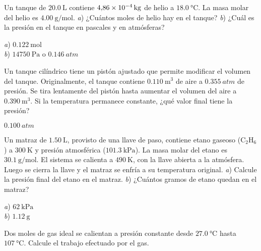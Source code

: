 \setcounter{figure}{0}
%
\begin{Exercise}
  Un tanque de $\SI{20.0}{\liter}$ contiene $\SI{4.86E-4}{\kilogram}$ de helio a $\SI{18.0}{\celsius}$. La masa molar del helio es $\SI{4.00}{\gram/\mole}$. \textit{a}) ¿Cuántos moles de helio hay en el tanque? \textit{b}) ¿Cuál es la presión en el tanque en pascales y en atmósferas?
\end{Exercise}
\begin{Answer}
	\begin{minipage}[t]{.4\textwidth}
    \textit{a}) $\SI{0.122}{\mole}$\\ \textit{b}) $\SI{14750}{\pascal}$ o $\SI{0.146}{atm}$
  \end{minipage}
\end{Answer}
%
\begin{Exercise}
  Un tanque cilíndrico tiene un pistón ajustado que permite modificar el volumen del tanque. Originalmente, el tanque contiene $\SI{0.110}{\cubic\metre}$ de aire a $\SI{0.355}{atm}$ de presión. Se tira lentamente del pistón hasta aumentar el volumen del aire a $\SI{0.390}{\cubic\metre}$. Si la temperatura permanece constante, ¿qué valor final tiene la presión?
\end{Exercise}
\begin{Answer}
  $\SI{0.100}{atm}$
\end{Answer}
%
\begin{Exercise}
  Un matraz de $\SI{1.50}{\liter}$, provisto de una llave de paso, contiene etano gaseoso ($\text{C}_2\text{H}_6$) a $\SI{300}{\kelvin}$ y presión atmosférica ($\SI{101.3}{\kilo\pascal}$). La masa molar del etano es $\SI{30.1}{\gram/\mole}$. El sistema se calienta a $\SI{490}{\kelvin}$, con la llave abierta a la atmósfera. Luego se cierra la llave y el matraz se enfría a su temperatura  original. \textit{a}) Calcule la presión final del etano en el matraz. \textit{b}) ¿Cuántos gramos de etano quedan en el matraz?
\end{Exercise}
\begin{Answer}
	\begin{minipage}[t]{.4\textwidth}
    \textit{a}) $\SI{62}{\kilo\pascal}$\\ \textit{b}) $\SI{1.12}{\gram}$
  \end{minipage}
\end{Answer}
%
\begin{Exercise}
  Dos moles de gas ideal se calientan a presión constante desde $\SI{27.0}{\celsius}$ hasta $\SI{107}{\celsius}$. Calcule el trabajo efectuado por el gas.
\end{Exercise}
